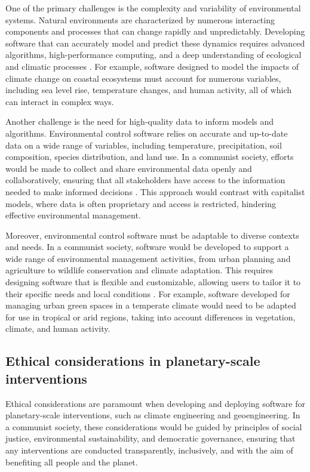One of the primary challenges is the complexity and variability of environmental systems. Natural environments are characterized by numerous interacting components and processes that can change rapidly and unpredictably. Developing software that can accurately model and predict these dynamics requires advanced algorithms, high-performance computing, and a deep understanding of ecological and climatic processes \cite[pp.~150-158]{beven2012rainfall}. For example, software designed to model the impacts of climate change on coastal ecosystems must account for numerous variables, including sea level rise, temperature changes, and human activity, all of which can interact in complex ways.

Another challenge is the need for high-quality data to inform models and algorithms. Environmental control software relies on accurate and up-to-date data on a wide range of variables, including temperature, precipitation, soil composition, species distribution, and land use. In a communist society, efforts would be made to collect and share environmental data openly and collaboratively, ensuring that all stakeholders have access to the information needed to make informed decisions \cite[pp.~88-95]{peters2012data}. This approach would contrast with capitalist models, where data is often proprietary and access is restricted, hindering effective environmental management.

Moreover, environmental control software must be adaptable to diverse contexts and needs. In a communist society, software would be developed to support a wide range of environmental management activities, from urban planning and agriculture to wildlife conservation and climate adaptation. This requires designing software that is flexible and customizable, allowing users to tailor it to their specific needs and local conditions \cite[pp.~175-182]{gurney2008adaptation}. For example, software developed for managing urban green spaces in a temperate climate would need to be adapted for use in tropical or arid regions, taking into account differences in vegetation, climate, and human activity.

\subsection{Ethical considerations in planetary-scale interventions}

Ethical considerations are paramount when developing and deploying software for planetary-scale interventions, such as climate engineering and geoengineering. In a communist society, these considerations would be guided by principles of social justice, environmental sustainability, and democratic governance, ensuring that any interventions are conducted transparently, inclusively, and with the aim of benefiting all people and the planet.

